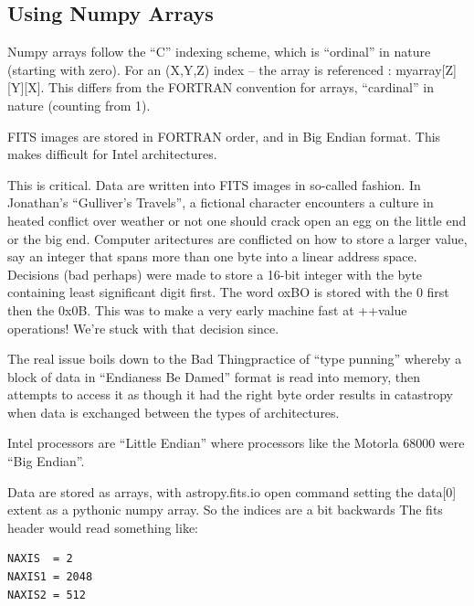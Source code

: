 \documentclass[letter,11pt,oneside]{article}
\newcommand{\dhl}[1]{{\color{verbcolor}{\texttt#1}}}
\begin{document}
\subsection{Using Numpy Arrays}

Numpy arrays follow the ``C'' indexing scheme, which is ``ordinal'' in nature
(starting with zero). For an (X,Y,Z) index -- the array is referenced \dhl{backwards}:
myarray[Z][Y][X]. This differs from the FORTRAN convention for arrays, ``cardinal''
in nature (counting from 1).

FITS images are stored in FORTRAN order, and in Big Endian format. This makes
difficult for Intel architectures.

This is critical. Data are written into FITS images in so-called \dhl{Big-Endian}
fashion. In Jonathan's ``Gulliver's Travels'', a fictional character encounters
a culture in heated conflict over weather or not one should crack open an
egg on the little end or the big end. Computer aritectures are conflicted on
how to store a larger value, say an integer that spans more than one byte
into a linear address space. Decisions (bad perhaps) were made to store
a 16-bit integer with the byte containing least significant digit first.
The word oxBO is stored with the 0 first then the 0x0B. This was to make
a very early machine fast at ++value operations! We're stuck with that decision
since.

The real issue boils down to the Bad Thing\texttrademark practice of
``type punning'' whereby a block of data in ``Endianess Be Damed''
format is read into memory, then attempts to access it as though it
had the right byte order results in catastropy when data is exchanged
between the types of architectures.

Intel processors are ``Little Endian'' where processors like the Motorla
68000 were ``Big Endian''. 

Data are stored as arrays, with astropy.fits.io open command setting the
data[0] extent as a pythonic numpy array. So the indices are a bit backwards
The fits header would read something like:

\begingroup \fontsize{10pt}{10pt}
\selectfont
\begin{verbatim} 
NAXIS  = 2
NAXIS1 = 2048
NAXIS2 = 512
\end{verbatim}
\endgroup
\end{document}
